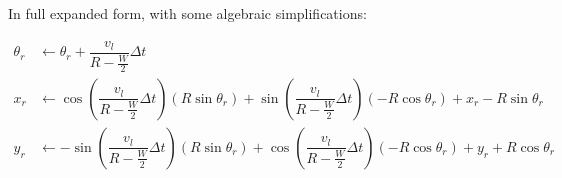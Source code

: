 \documentclass{article}
\begin{document}
In full expanded form, with some algebraic simplifications:

\begin{align}
 \theta_r &\leftarrow \theta_r + \dfrac{v_l}{R-\frac{W}{2}}\Delta t \\
  x_r &\leftarrow \cos{(\dfrac{v_l}{R-\frac{W}{2}}\Delta t)}(R\sin{\theta_r})+\sin{(\dfrac{v_l}{R-\frac{W}{2}}\Delta t)}(-R\cos{\theta_r}) + x_r-R\sin{\theta_r} \\
  y_r &\leftarrow -\sin{(\dfrac{v_l}{R-\frac{W}{2}}\Delta t)}(R\sin{\theta_r})+\cos{(\dfrac{v_l}{R-\frac{W}{2}}\Delta t)}(-R\cos{\theta_r}) + y_r+R\cos{\theta_r}
\end{align}
\end{document}
